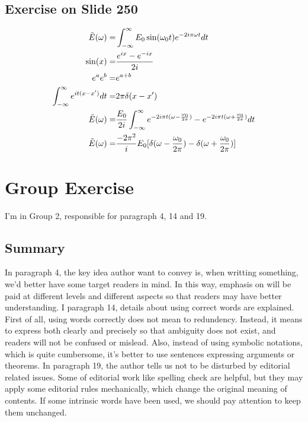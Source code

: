 \documentclass[paper=a4, fontsize=11pt]{scrartcl} %
\numberwithin{equation}{section} %
\numberwithin{figure}{section} %
\numberwithin{table}{section} %
\begin{document}
	\subsection{Exercise on Slide 250}
		\begin{equation}\notag
			\begin{aligned}
				\tilde{E}(\omega)=& \int_{-\infty}^{\infty}E_0\sin(\omega_0t)e^{-2i\pi\omega t}dt \\
				\sin(x)= & \frac{e^{ix}-e^{-ix}}{2i} \\
				e^ae^b= & e^{a+b} \\
				\int_{-\infty}^{\infty}e^{it(x-x')}dt=&2\pi \delta(x-x')\\
				\tilde{E}(\omega)=& \frac{E_0}{2i}\int_{-\infty}^{\infty}e^{-2i\pi t(\omega-\frac{\omega_0}{2\pi})}-e^{-2i\pi t(\omega+\frac{\omega_0}{2\pi})}dt \\
				\tilde{E}(\omega)=&\frac{-2\pi^2}{i}E_0[\delta(\omega-\frac{\omega_0}{2\pi})-\delta(\omega+\frac{\omega_0}{2\pi})]
			\end{aligned}
		\end{equation}
		
\section{Group Exercise}
	I'm in Group 2, responsible for paragraph 4, 14 and 19.
	\subsection{Summary}
		In paragraph 4, the key idea author want to convey is, when writting something, we'd better have some target readers in mind. In this way, emphasis on will be paid at different levels and different aspects so that readers may have better understanding.\newline
		I paragraph 14, details about using correct words are explained. First of all, using words correctly does not mean to redundency. Instead, it means to express both clearly and precisely so that ambiguity does not exist, and readers will not be confused or mislead. Also, instead of using symbolic notations, which is quite cumbersome, it's better to use sentences expressing arguments or theorems.\newline
		In paragraph 19, the author tells us not to be disturbed by editorial related issues. Some of editorial work like spelling check are helpful, but they may apply some editorial rules mechanically, which change the original meaning of contents. If some intrinsic words have been used, we should pay attention to keep them unchanged.
\end{document}
